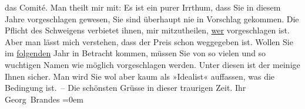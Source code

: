 \begin{ledgroupsized}[t]{13cm}
                    das Comité. Man theilt mir mit:\pend
           \pstart
           Es ist ein purer Irrthum, dass Sie in diesem Jahre vorgeschlagen gewesen, Sie
                    sind überhaupt nie in Vorschlag gekommen. Die Pflicht des Schweigens verbietet
                    ihnen, mir mitzutheilen, \uline{wer} vorgeschlagen ist.
                    Aber man lässt mich verstehen, dass der Preis schon weggegeben ist.\pend
           \pstart
           Wollen Sie im \uline{folgenden} Jahr in Betracht kommen,
                    müssen Sie  von so vielen und so
                    wuchtigen Namen wie möglich vorgeschlagen werden. Unter diesen ist der meinige
                    Ihnen sicher. Man wird Sie wol aber kaum als »Idealist« auffassen, was die
                    Bedingung ist. – Die schönsten Grüsse in dieser traurigen Zeit.\pend
           \pstart
           Ihr{\\[\baselineskip]}\spacefill\mbox{Georg Brandes}\pend
           \leftskip=0em{}\endnumbering{}\end{ledgroupsized}  \newcommand{\dateiname}{L02198}\newcommand{\titel}{Georg Brandes an Arthur Schnitzler, 18. 10. 1914}\newcommand{\editorInnen}{Martin Anton Müller und Gerd-Hermann Susen}
      